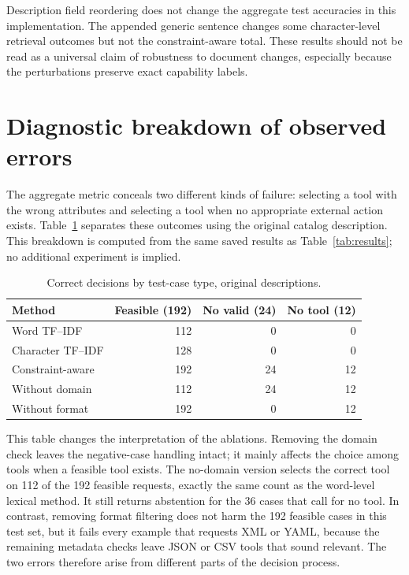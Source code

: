 \documentclass[10pt,a4paper]{article}
\begin{document}
Description field reordering does not change the aggregate test accuracies in this implementation. The appended generic sentence changes some character-level retrieval outcomes but not the constraint-aware total. These results should not be read as a universal claim of robustness to document changes, especially because the perturbations preserve exact capability labels.


\section{Diagnostic breakdown of observed errors}
The aggregate metric conceals two different kinds of failure: selecting a tool with the wrong attributes and selecting a tool when no appropriate external action exists. Table~\ref{tab:cases} separates these outcomes using the original catalog description. This breakdown is computed from the same saved results as Table~\ref{tab:results}; no additional experiment is implied.

\begin{table}[H]\centering\small
\caption{Correct decisions by test-case type, original descriptions.}\label{tab:cases}
\begin{tabular}{@{}lrrr@{}}\toprule
Method & Feasible (192) & No valid (24) & No tool (12)\\\midrule
Word TF--IDF&112&0&0\\
Character TF--IDF&128&0&0\\
Constraint-aware&192&24&12\\
Without domain&112&24&12\\
Without format&192&0&12\\\bottomrule
\end{tabular}
\end{table}

This table changes the interpretation of the ablations. Removing the domain check leaves the negative-case handling intact; it mainly affects the choice among tools when a feasible tool exists. The no-domain version selects the correct tool on 112 of the 192 feasible requests, exactly the same count as the word-level lexical method. It still returns abstention for the 36 cases that call for no tool. In contrast, removing format filtering does not harm the 192 feasible cases in this test set, but it fails every example that requests XML or YAML, because the remaining metadata checks leave JSON or CSV tools that sound relevant. The two errors therefore arise from different parts of the decision process.
\end{document}
